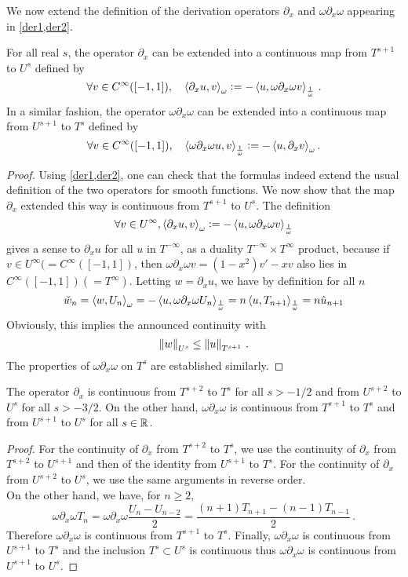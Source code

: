 \documentclass[a4paper]{article}
\begin{document}
\noindent We now extend the definition of the derivation operators $\partial_x$ and $\omega\partial_x\omega$ appearing in \cref{der1,der2}. 
\begin{Lem}
	\label{derivations}
	For all real $s$, the operator $\partial_x$ can be extended into a continuous map from $T^{s+1}$ to $U^{s}$ defined by 
	\[\forall v \in C^{\infty}([-1,1]), \quad \left\langle \partial_x u,v\right\rangle_{\omega} \mathrel{\mathop:}= -\left\langle u,\omega \partial_x \omega v\right\rangle_{\frac{1}{\omega}} \,.\] 
	In a similar fashion, the  operator $\omega \partial_x \omega$ can be extended into a continuous map from $U^{s+1}$ to $T^{s}$ defined by
	\[\forall v \in C^{\infty}([-1,1]), \quad \left\langle \omega \partial_x \omega u,v\right\rangle_\frac{1}{\omega} \mathrel{\mathop:}= -\left\langle u,\partial_x v\right\rangle_\omega.\]
\end{Lem}
\begin{proof}
	Using \cref{der1,der2}, one can check that the formulas indeed extend the usual definition of the two operators for smooth functions. We now show that the map $\partial_x$ extended this way is continuous from $T^{s+1}$ to $U^s$. The definition 
	\[\forall v \in U^{\infty}, \left\langle \partial_x u,v\right\rangle_\omega \mathrel{\mathop:}= -\left\langle u,\omega \partial_x \omega v\right\rangle_\frac{1}{\omega}\]
	gives a sense to $\partial_x u$ for all $u$ in $T^{-\infty}$, as a duality $T^{-\infty} \times T^{\infty}$ product, because if $v \in U^{\infty} (= C^{\infty}([-1,1])$, then $\omega \partial_x \omega v = (1-x^2)v' - xv$ also lies in $C^{\infty}([-1,1]) (= T^\infty)$. Letting $w = \partial_x u$, we have by definition for all $n$
	\[\check{w}_n = \left\langle w,U_n\right\rangle_{\omega} = - \left\langle u,\omega \partial_x \omega U_n\right\rangle_\frac{1}{\omega} = n \left\langle u,T_{n+1}\right\rangle_\frac{1}{\omega} = n\hat{u}_{n+1}\]
	Obviously, this implies the announced continuity with
	\[ \left\|w\right\|_{U^s} \leq \left\|u\right\|_{T^{s+1}}\,.\]
	The properties of $\omega \partial_x \omega$ on $T^s$ are established similarly. 
\end{proof}
\begin{Cor}
	\label{corDxT2T0}
	The operator $\partial_x$ is continuous from $T^{s+2}$ to $T^s$ for all $s > -1/2 $ and from $U^{s+2}$ to $U^s$ for all $s > - 3/2$. On the other hand, $\omega \partial_x \omega$ is continuous from $T^{s+1}$ to $T^s$ and from $U^{s+1}$ to $U^s$ for all $s \in \mathbb{R}$. 
\end{Cor}
\begin{proof}
	For the continuity of $\partial_x$ from $T^{s+2}$ to $T^s$, we use the continuity of $\partial_x$ from $T^{s+2}$ to $U^{s+1}$ and then of the identity from $U^{s+1}$ to $T^s$. For the continuity of $\partial_x$ from $U^{s+2}$ to $U^s$, we use the same arguments in reverse order. \\
	On the other hand, we have, for $n \geq 2$,
	\[\omega \partial_x \omega T_n = \omega\partial_x \omega \frac{U_n - U_{n-2}}{2} = \frac{(n+1)T_{n+1} - (n-1)T_{n-1}}{2}\,.\]
	Therefore $\omega \partial_x \omega$ is continuous from $T^{s+1}$ to $T^s$. Finally, $\omega \partial_x \omega$ is continuous from $U^{s+1}$ to $T^s$ and the inclusion $T^s \subset U^s$ is continuous thus $\omega \partial_x \omega$ is continuous from $U^{s+1}$ to $U^s$.  
\end{proof}
\end{document}
